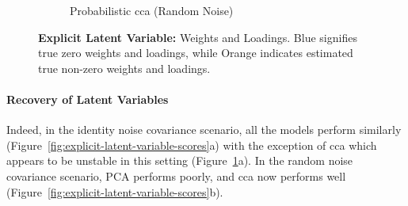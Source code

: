 \begin{figure}
\begin{subfigure}{0.49\linewidth}
        \caption{Probabilistic \acrshort{cca} (Random Noise)}
    \end{subfigure}
    \caption{\textbf{Explicit Latent Variable:} Weights and Loadings. Blue signifies true zero weights and loadings, while Orange indicates estimated true non-zero weights and loadings.}\label{fig:explicit-latent-variable-weights-loadings}
\end{figure}

\paragraph{Recovery of Latent Variables}

Indeed, in the identity noise covariance scenario, all the models perform similarly (Figure~\ref{fig:explicit-latent-variable-scores}a) with the exception of \acrshort{cca} which appears to be unstable in this setting (Figure~\ref{fig:explicit-latent-variable-weights-loadings}a).
In the random noise covariance scenario, PCA performs poorly, and \acrshort{cca} now performs well (Figure~\ref{fig:explicit-latent-variable-scores}b).

